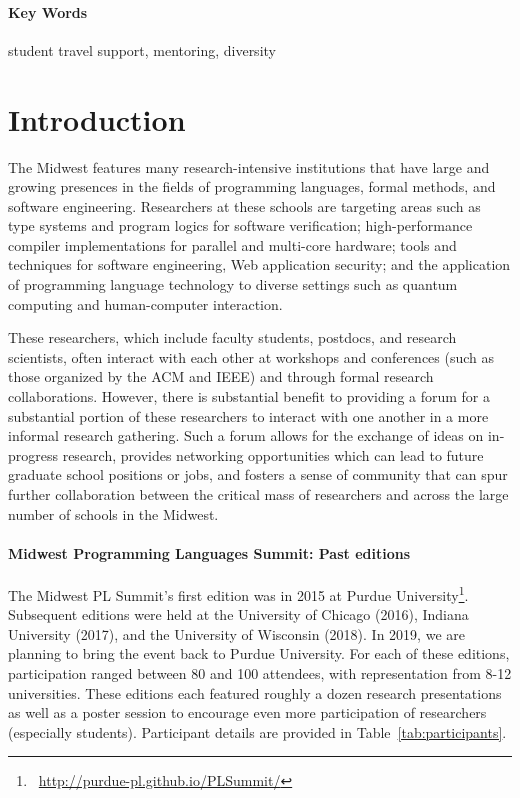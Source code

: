 \documentclass[11pt]{article}
\newcommand{\parahead}[1]{\paragraph{#1}}
\def\mwpls{Midwest Programming Languages Summit}
\begin{document}
\parahead{Key Words} student travel support, mentoring,
diversity

\newpage
{}
\setcounter{page}{1}

\section{Introduction}

The Midwest features many research-intensive institutions that have large and growing presences in the fields of programming languages, formal methods, and software engineering. Researchers at these schools are targeting areas such as
type systems and program logics for
software verification; high-performance compiler implementations for
parallel and multi-core hardware; tools and techniques for software
engineering, Web application security; and the application of
programming language technology to diverse settings such as quantum
computing and human-computer interaction.

These researchers, which include faculty students, postdocs, and research scientists, often interact with each other at workshops and conferences (such as those organized by the ACM and IEEE) and through formal research collaborations. However, there is substantial benefit to providing a forum for a substantial portion of these researchers to interact with one another in a more informal research gathering. Such a forum allows for the exchange of ideas on in-progress research, provides networking opportunities which can lead to future graduate school positions or jobs, and fosters a sense of community that can spur further collaboration between the critical mass of researchers and across the large number of schools in the Midwest.

\parahead{\mwpls{}: Past editions}

The Midwest PL Summit's first edition was in 2015 at Purdue University\footnote{~\url{http://purdue-pl.github.io/PLSummit/}}. Subsequent editions were held at the University of Chicago (2016), Indiana University (2017), and the University of Wisconsin (2018). In 2019, we are planning to bring the event back to Purdue University. For each of these editions, participation ranged between 80 and 100 attendees, with representation from 8-12 universities. These editions each featured roughly a dozen research presentations as well as a poster session to encourage even more participation of researchers (especially students). Participant details are provided in Table~\ref{tab:participants}.
\end{document}
